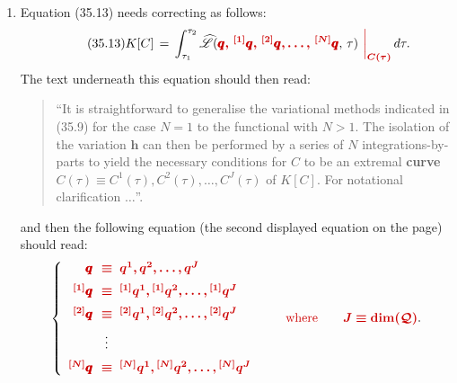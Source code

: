\documentclass[12pt]{GeomPhysBOOK}
\newcommand\correct[1]{{\color{red!80!black}\bf #1}}
\newcommand\mcorrect[1]{{\color{red!80!black}\bm{#1}}}
\newcommand\listrule{\vspace{0.2cm}\hrule height 0.3pt}
\begin{document}
\begin{enumerate}[leftmargin=1.9cm,labelwidth=1.4cm,itemsep=0.5cm]
\begin{align}
			\begin{split}
				I[C+\pmb{h}] - I[C] &\,=\, \int_{t_{1}}^{t_{2}}\left\{ \wh{\mathscr{L}}(\qq+\pmb{h},\,\dot{\qq}+\dot{\pmb{h}},\, t) - \wh{\mathscr{L}}(\qq,\,\dot{\qq},\, t) \right\}\mcorrect{\left.\df\right|_{C(t)}}\,dt \\[0.2cm]
					&\,=\, \int_{t_{1}}^{t_{2}}\left\{ \frac{\partial\wh{\mathscr{L}}}{\partial \qq}\,\pmb{h} +  \frac{\partial\wh{\mathscr{L}}}{\partial \dot{\qq}}\,\dot{\pmb{h}} \right\}\mcorrect{\left.\df\right|_{C(t)}}\,dt + O\!\left(\norm{\pmb{h}}^{2}\right).
			\end{split} 
		\end{align}
	\newpage
	\listrule
	\item[\underline{page 690}:]
		Equation (35.13) needs correcting as follows:
		\begin{align}\tag{35.13}
			K[C] \,=\, \int_{\tau_{1}}^{\tau_{2}}\wh{\mathscr{L}}(\mcorrect{\qq,\,{}^{[1]}\qq,\,{}^{[2]}\qq,\ldots,\,{}^{[N]}\qq},\, \tau)\mcorrect{\left.\df\right|_{C(\tau)}} \,d\tau.
		\end{align}
		The text underneath this equation should then read:
		\begin{quote}
			``It is straightforward to generalise the variational methods indicated in (35.9) for the case $N=1$ to the functional with $N>1$. The isolation of the variation $\pmb{h}$ can then be performed by a series of $N$ integrations-by-parts to yield the necessary conditions for $C$ to be an extremal \correct{curve $C(\tau)\equiv C^{1}(\tau),C^{2}(\tau),\ldots,C^{J}(\tau)$} of $K[C]$. For notational clarification $\ldots$''.
		\end{quote}
		and then the following equation (the second displayed equation on the page) should read:		
		\begin{align*}
			\left\{	\begin{array}{rl}
						\mcorrect{\qq} &\mcorrect{\!\!\equiv\; q^{1},q^{2},\ldots,q^{J}} \\[0.2cm]
						\mcorrect{{}^{[1]}\qq} 	&\mcorrect{\!\!\equiv\; {}^{[1]}q^{1}, {}^{[1]}q^{2}, \ldots, {}^{[1]}q^{J}} \\[0.2cm]
						\mcorrect{{}^{[2]}\qq} 	&\mcorrect{\!\!\equiv\; {}^{[2]}q^{1}, {}^{[2]}q^{2}, \ldots, {}^{[2]}q^{J}} \\[0.2cm]
									&\;\!\!\vdots \\[0.2cm]
						\mcorrect{{}^{[N]}\qq} 	&\mcorrect{\!\!\equiv\; {}^{[N]}q^{1}, {}^{[N]}q^{2}, \ldots, {}^{[N]}q^{J}}
					\end{array}\right. \qquad\mcorrect{\text{where}\qquad J\equiv \dim(\mathcal{Q})}.

\end{align*}
\end{enumerate}
\end{document}
